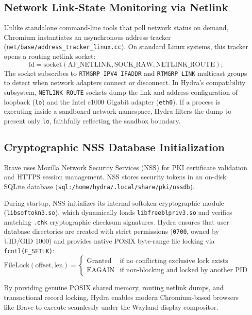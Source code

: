 \subsection{Network Link-State Monitoring via Netlink}
Unlike standalone command-line tools that poll network status on demand, Chromium instantiates an asynchronous address tracker (\texttt{net/base/address\_tracker\_linux.cc}). On standard Linux systems, this tracker opens a routing netlink socket:
\begin{equation}
\text{fd} = \text{socket}(\text{AF\_NETLINK}, \text{SOCK\_RAW}, \text{NETLINK\_ROUTE});
\end{equation}
The socket subscribes to \texttt{RTMGRP\_IPV4\_IFADDR} and \texttt{RTMGRP\_LINK} multicast groups to detect when network adapters connect or disconnect. In Hydra's compatibility subsystem, \texttt{NETLINK\_ROUTE} sockets dump the link and address configuration of loopback (\texttt{lo}) and the Intel e1000 Gigabit adapter (\texttt{eth0}). If a process is executing inside a sandboxed network namespace, Hydra filters the dump to present only \texttt{lo}, faithfully reflecting the sandbox boundary.

\subsection{Cryptographic NSS Database Initialization}
Brave uses Mozilla Network Security Services (NSS) for PKI certificate validation and HTTPS session management. NSS stores security tokens in an on-disk SQLite database (\texttt{sql:/home/hydra/.local/share/pki/nssdb}). 

During startup, NSS initializes its internal softoken cryptographic module (\texttt{libsoftokn3.so}), which dynamically loads \texttt{libfreeblpriv3.so} and verifies matching \texttt{.chk} cryptographic checksum signatures. Hydra ensures that user database directories are created with strict permissions (\texttt{0700}, owned by UID/GID 1000) and provides native POSIX byte-range file locking via \texttt{fcntl(F\_SETLK)}:
\begin{equation}
\text{FileLock}(\text{offset}, \text{len}) = \begin{cases}
    \text{Granted} & \text{if no conflicting exclusive lock exists} \\
    \text{EAGAIN} & \text{if non-blocking and locked by another PID}
\end{cases}
\end{equation}

By providing genuine POSIX shared memory, routing netlink dumps, and transactional record locking, Hydra enables modern Chromium-based browsers like Brave to execute seamlessly under the Wayland display compositor.

